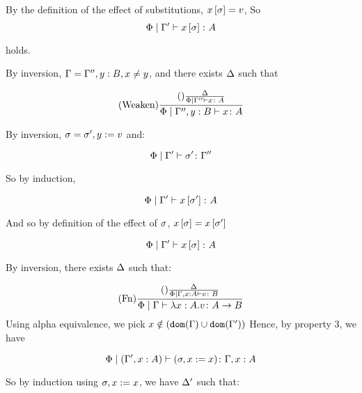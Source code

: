 {            By the definition of the effect of substitutions, $x\left[\sigma\right] = v$, So
            \begin{equation}
                \Phi\mid\Gamma' \vdash x\left[\sigma\right] \colon A
            \end{equation}

            holds.
            
            By inversion, $\Gamma = \Gamma'', y: B, x \neq y$, and there exists $\Delta$ such that
 
            \begin{equation}
                (\text{Weaken}) \frac{(\text{}) \frac{\Delta}{\Phi\mid\Gamma'' \vdash x \colon A}}{\Phi\mid\Gamma'', y: B \vdash x \colon A}
            \end{equation}

            By inversion, $\sigma = \sigma', y:= v$
            and:

            \begin{equation}
                \Phi\mid\Gamma' \vdash \sigma' \colon \Gamma''
            \end{equation}

            So by induction,

            \begin{equation}
                \Phi\mid\Gamma' \vdash x\left[\sigma'\right] \colon A
            \end{equation}

            And so by definition of the effect of $\sigma$, $x\left[\sigma\right] = x\left[\sigma'\right]$

            \begin{equation}
                \Phi\mid\Gamma' \vdash x\left[\sigma\right] \colon A
            \end{equation}

        By inversion, there exists $\Delta$ such that:

        \begin{equation}
            (\text{Fn}) \frac{
                (\text{}) \frac{\Delta}{\Phi\mid\Gamma, x:A  \vdash v \colon B}
            }{\Phi\mid\Gamma \vdash \lambda x : A. v \colon A\rightarrow B}
        \end{equation}
        Using alpha equivalence, we pick $x\notin(\texttt{dom}(\Gamma)\cup\texttt{dom}(\Gamma'))$
        Hence, by property 3, we have

        \begin{equation}
            \Phi\mid(\Gamma', x:A ) \vdash (\sigma, x:= x) \colon \Gamma, x: A
        \end{equation}

        So by induction using $\sigma,x:= x$, we have $\Delta'$ such that:

}
